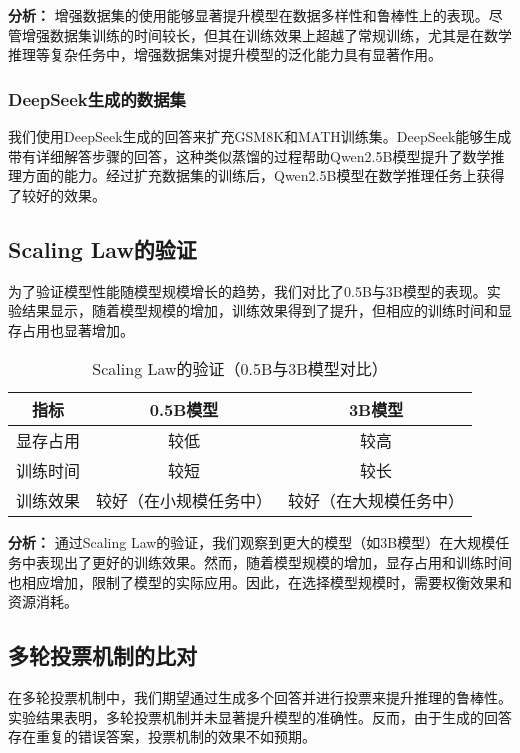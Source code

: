 \documentclass{article}
\begin{document}
\textbf{分析：}
增强数据集的使用能够显著提升模型在数据多样性和鲁棒性上的表现。尽管增强数据集训练的时间较长，但其在训练效果上超越了常规训练，尤其是在数学推理等复杂任务中，增强数据集对提升模型的泛化能力具有显著作用。

\subsubsection{DeepSeek生成的数据集}
我们使用DeepSeek生成的回答来扩充GSM8K和MATH训练集。DeepSeek能够生成带有详细解答步骤的回答，这种类似蒸馏的过程帮助Qwen2.5B模型提升了数学推理方面的能力。经过扩充数据集的训练后，Qwen2.5B模型在数学推理任务上获得了较好的效果。

\subsection{Scaling Law的验证}
为了验证模型性能随模型规模增长的趋势，我们对比了0.5B与3B模型的表现。实验结果显示，随着模型规模的增加，训练效果得到了提升，但相应的训练时间和显存占用也显著增加。

\begin{table}[H]
    \caption{Scaling Law的验证（0.5B与3B模型对比）}
    \label{scaling-law-comparison}
    \centering
    \begin{tabular}{|c|c|c|}
        \hline
        \textbf{指标} & \textbf{0.5B模型} & \textbf{3B模型} \\ \hline
        显存占用 & 较低 & 较高 \\ \hline
        训练时间 & 较短 & 较长 \\ \hline
        训练效果 & 较好（在小规模任务中） & 较好（在大规模任务中） \\ \hline
    \end{tabular}
\end{table}

\textbf{分析：}
通过Scaling Law的验证，我们观察到更大的模型（如3B模型）在大规模任务中表现出了更好的训练效果。然而，随着模型规模的增加，显存占用和训练时间也相应增加，限制了模型的实际应用。因此，在选择模型规模时，需要权衡效果和资源消耗。

\subsection{多轮投票机制的比对}
在多轮投票机制中，我们期望通过生成多个回答并进行投票来提升推理的鲁棒性。实验结果表明，多轮投票机制并未显著提升模型的准确性。反而，由于生成的回答存在重复的错误答案，投票机制的效果不如预期。
\end{document}
